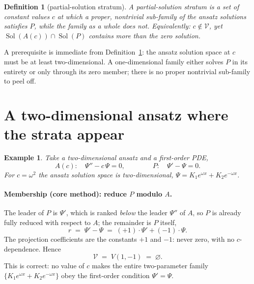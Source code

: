 \documentclass[11pt]{article}
\newcommand{\Psib}{\Psi}
\newcommand{\Var}{\mathcal{V}}
\DeclareMathOperator{\Sol}{Sol}
\newtheorem{definition}{Definition}
\newtheorem{example}{Example}
\begin{document}
\begin{definition}[partial-solution stratum]
\label{def:partial}
A \emph{partial-solution stratum} is a set of constant values $c$ at which a
\emph{proper, nontrivial} sub-family of the ansatz solutions satisfies $P$,
while the family as a whole does not. Equivalently: $c \notin \Var$, yet
$\Sol(A(c)) \cap \Sol(P)$ contains more than the zero solution.
\end{definition}

A prerequisite is immediate from Definition~\ref{def:partial}: the ansatz
solution space at $c$ must be at least two-dimensional. A one-dimensional
family either solves $P$ in its entirety or only through its zero member;
there is no proper nontrivial sub-family to peel off.

\section{A two-dimensional ansatz where the strata appear}

\begin{example}
\label{ex:partial}
Take a two-dimensional ansatz and a first-order PDE,
%
\begin{equation}
\label{eq:ex2}
A(c): \quad \Psib'' - c\,\Psib = 0,
\qquad\qquad
P: \quad \Psib' - \Psib = 0 .
\end{equation}
%
For $c = \omega^2$ the ansatz solution space is two-dimensional,
$\Psib = K_1 e^{\omega x} + K_2 e^{-\omega x}$.
\end{example}

\paragraph{Membership (core method): reduce $P$ modulo $A$.}
The leader of $P$ is $\Psib'$, which is ranked \emph{below} the leader $\Psib''$
of $A$, so $P$ is already fully reduced with respect to $A$; the remainder is
$P$ itself,
%
\[
r \;=\; \Psib' - \Psib \;=\; (+1)\cdot\Psib' + (-1)\cdot\Psib .
\]
%
The projection coefficients are the constants $+1$ and $-1$: never zero, with
no $c$-dependence. Hence
%
\[
\Var \;=\; V(1, -1) \;=\; \varnothing .
\]
%
This is correct: no value of $c$ makes the entire two-parameter family
$\{K_1 e^{\omega x} + K_2 e^{-\omega x}\}$ obey the first-order condition
$\Psib' = \Psib$.
\end{document}
